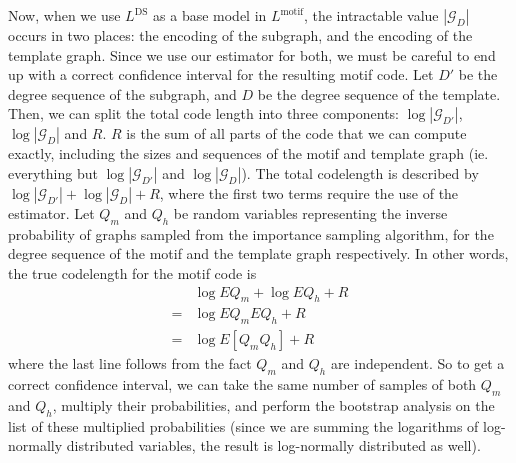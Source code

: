 \documentclass[twoside,11pt]{article}
\newcommand{\cG}{{\mathcal G}}
\begin{document}
Now, when we use $L^\text{DS}$ as a base model in $L^\text{motif}$, the intractable value $|\cG_D|$ occurs in two places: the encoding of the subgraph, and the encoding of the template graph. Since we use our estimator for both, we must be careful to end up with a correct confidence interval for the resulting motif code. Let $D'$ be the degree sequence of the subgraph, and $D$ be the degree sequence of the template. Then, we can split the total code length into three components: $\log |\cG_{D'}|$, $\log |\cG_D|$ and $R$. $R$ is the sum of all parts of the code that we can compute exactly, including the sizes and sequences of the motif and template graph (ie. everything but $\log |\cG_{D'}|$ and $\log |\cG_D|$). The total codelength is described by $\log |\cG_{D'}| + \log |\cG_D| + R$, where the first two terms require the use of the estimator. Let $Q_m$ and $Q_h$ be random variables representing the inverse probability of graphs sampled from the importance sampling algorithm, for the degree sequence of the motif and the template graph respectively. In other words, the true codelength for the motif code is
\begin{align*}
& \log E Q_m + \log  E Q_h + R \\ 
= & \log E Q_m E Q_h + R \\
= & \log E [Q_m Q_h] + R
\end{align*}
where the last line follows from the fact $Q_m$ and $Q_h$ are independent. So to get a correct confidence interval, we can take the same number of samples of both $Q_m$ and $Q_h$, multiply their probabilities, and perform the bootstrap analysis on the list of these multiplied probabilities (since we are summing the logarithms of log-normally distributed variables, the result is log-normally distributed as well). 



\end{document}
